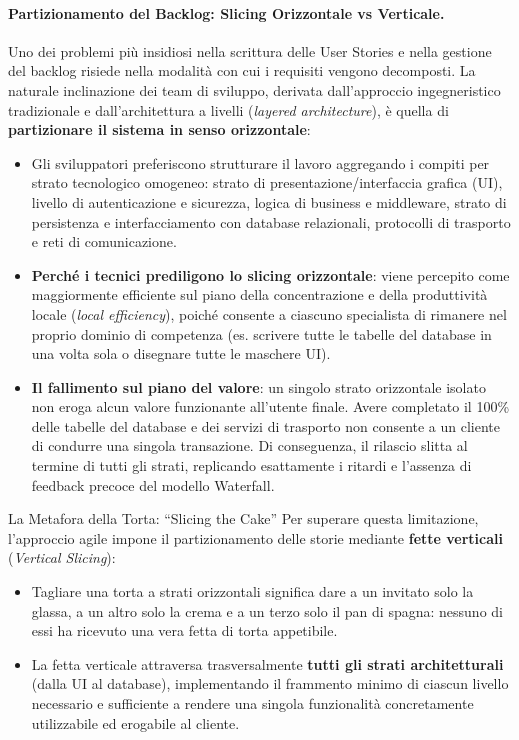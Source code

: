 \documentclass[12pt]{extarticle}
\begin{document}
\paragraph{Partizionamento del Backlog: Slicing Orizzontale vs Verticale.}
Uno dei problemi più insidiosi nella scrittura delle User Stories e nella gestione del backlog risiede nella modalità con cui i requisiti vengono decomposti. La naturale inclinazione dei team di sviluppo, derivata dall'approccio ingegneristico tradizionale e dall'architettura a livelli (\textit{layered architecture}), è quella di \textbf{partizionare il sistema in senso orizzontale}:
\begin{itemize}
    \item Gli sviluppatori preferiscono strutturare il lavoro aggregando i compiti per strato tecnologico omogeneo: strato di presentazione/interfaccia grafica (UI), livello di autenticazione e sicurezza, logica di business e middleware, strato di persistenza e interfacciamento con database relazionali, protocolli di trasporto e reti di comunicazione.
    \item \textbf{Perché i tecnici prediligono lo slicing orizzontale}: viene percepito come maggiormente efficiente sul piano della concentrazione e della produttività locale (\textit{local efficiency}), poiché consente a ciascuno specialista di rimanere nel proprio dominio di competenza (es. scrivere tutte le tabelle del database in una volta sola o disegnare tutte le maschere UI).
    \item \textbf{Il fallimento sul piano del valore}: un singolo strato orizzontale isolato non eroga alcun valore funzionante all'utente finale. Avere completato il 100\% delle tabelle del database e dei servizi di trasporto non consente a un cliente di condurre una singola transazione. Di conseguenza, il rilascio slitta al termine di tutti gli strati, replicando esattamente i ritardi e l'assenza di feedback precoce del modello Waterfall.
\end{itemize}

\begin{cbox}{La Metafora della Torta: ``Slicing the Cake''}
\noindent Per superare questa limitazione, l'approccio agile impone il partizionamento delle storie mediante \textbf{fette verticali} (\textit{Vertical Slicing}):
\begin{itemize}
    \item Tagliare una torta a strati orizzontali significa dare a un invitato solo la glassa, a un altro solo la crema e a un terzo solo il pan di spagna: nessuno di essi ha ricevuto una vera fetta di torta appetibile.
    \item La fetta verticale attraversa trasversalmente \textbf{tutti gli strati architetturali} (dalla UI al database), implementando il frammento minimo di ciascun livello necessario e sufficiente a rendere una singola funzionalità concretamente utilizzabile ed erogabile al cliente.
\end{itemize}
\end{cbox}
\end{document}

